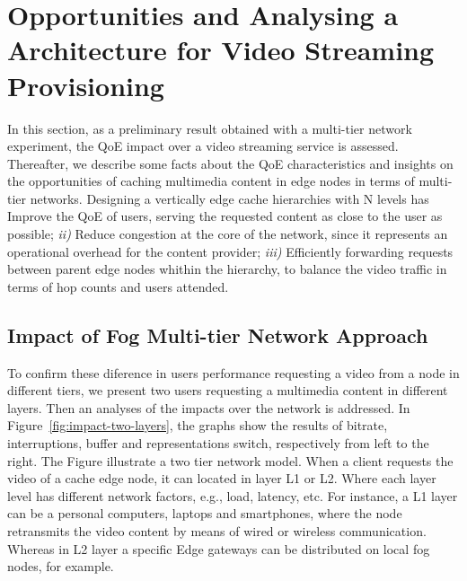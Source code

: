 \section{Opportunities and Analysing a Architecture for Video Streaming Provisioning}
\label{sec:system-archi}


In this section, as a preliminary result obtained with a multi-tier network experiment,  the QoE impact over a video streaming service is assessed. Thereafter, we describe some facts about the QoE characteristics and insights on the opportunities of caching multimedia content in edge nodes in terms of multi-tier networks. Designing a vertically edge cache hierarchies with N levels has Improve the QoE of users, serving the requested content as close to the user as possible; \textit{ii)} Reduce congestion at the core of the network, since it represents an operational overhead for the content provider; \textit{iii)} Efficiently forwarding requests between parent edge nodes whithin the hierarchy, to balance the video traffic in terms of hop counts and users attended. 


\subsection{Impact of Fog Multi-tier Network Approach}

To confirm these diference in users performance requesting a video from a node in different tiers, we present two users requesting a multimedia content in different layers. Then an analyses of the impacts over the network is addressed. In Figure~\ref{fig:impact-two-layers}, the graphs show the results of bitrate, interruptions, buffer and representations switch, respectively from left to the right.%
The Figure illustrate a two tier network model. When a client requests the video of a cache edge node, it can located in layer L1 or L2. Where each layer level has different network factors, e.g., load, latency, etc. For instance, a L1 layer can be a personal computers, laptops and smartphones, where the node retransmits the video content by means of wired or wireless communication. Whereas in L2 layer
a specific Edge gateways can be distributed on local fog nodes, for example.

